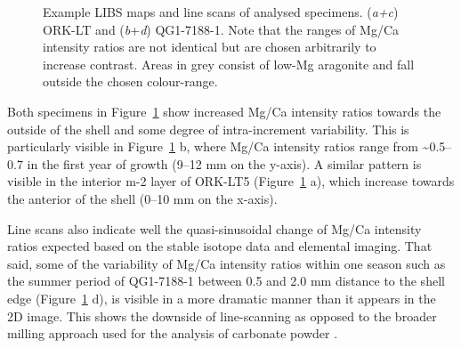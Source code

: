 \documentclass[
  authoryear,
  preprint,
  3p]{elsarticle}
\begin{document}
\begin{figure}[H]


\caption{\label{fig-Pat_LIBS}Example LIBS maps and line scans of
analysed specimens. (\emph{a+c}) ORK-LT and (\emph{b}+\emph{d})
QG1-7188-1. Note that the ranges of Mg/Ca intensity ratios are not
identical but are chosen arbitrarily to increase contrast. Areas in grey
consist of low-Mg aragonite and fall outside the chosen colour-range.}

\end{figure}%

Both specimens in Figure~\ref{fig-Pat_LIBS} show increased Mg/Ca
intensity ratios towards the outside of the shell and some degree of
intra-increment variability. This is particularly visible in
Figure~\ref{fig-Pat_LIBS} b, where Mg/Ca intensity ratios range from
\textasciitilde0.5--0.7 in the first year of growth (9--12 mm on the
y-axis). A similar pattern is visible in the interior m-2 layer of
ORK-LT5 (Figure~\ref{fig-Pat_LIBS} a), which increase towards the
anterior of the shell (0--10 mm on the x-axis).

Line scans also indicate well the quasi-sinusoidal change of Mg/Ca
intensity ratios expected based on the stable isotope data and elemental
imaging. That said, some of the variability of Mg/Ca intensity ratios
within one season such as the summer period of QG1-7188-1 between 0.5
and 2.0 mm distance to the shell edge (Figure~\ref{fig-Pat_LIBS} d), is
visible in a more dramatic manner than it appears in the 2D image. This
shows the downside of line-scanning as opposed to the broader milling
approach used for the analysis of carbonate powder
\citep{Ferguson2011-zl}.
\end{document}
